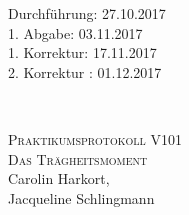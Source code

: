 

\begin{titlepage}
  \begin{flushleft}
 Durchführung: 27.10.2017\\
 1. Abgabe: 03.11.2017\\
 1. Korrektur: 17.11.2017\\
 2. Korrektur : 01.12.2017
  \end{flushleft}


\HRule\\[1,0cm]

 \begin{center}


\textsc{\LARGE Praktikumsprotokoll V101}\\[1.5cm]
\textsc{\huge Das Trägheitsmoment} \\[5,5cm]

Carolin Harkort\footnotemark[1], \\
Jacqueline Schlingmann\footnotemark[2] \\[1,0cm]



 \end{center}
\HRule

 \vfill

\end{titlepage}

  
  
  
  

